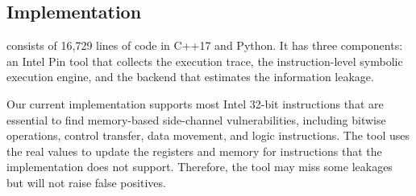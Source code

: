\subsection{Implementation}
\tool{} consists of 16,729 lines of code in C++17 and Python. It has three
components: an Intel Pin tool that collects the execution trace, the
instruction-level symbolic execution engine, and the backend that estimates
the information leakage. 

Our current implementation supports most Intel 32-bit instructions that are essential to find memory-based side-channel
vulnerabilities, including bitwise operations, control transfer, data movement, and logic
instructions. The tool uses the real values to update the registers and memory for instructions that the implementation does not support. 
Therefore, the tool may miss some leakages but will not raise false positives. 
